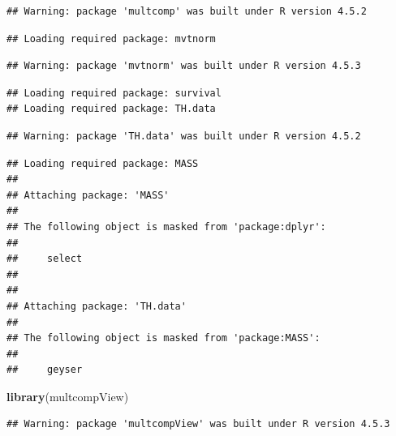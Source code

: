 \documentclass[
]{article}
\newenvironment{Shaded}{\begin{snugshade}}{\end{snugshade}}
\newcommand{\FunctionTok}[1]{\textcolor[rgb]{0.13,0.29,0.53}{\textbf{#1}}}
\newcommand{\NormalTok}[1]{#1}
\newcommand{\OtherTok}[1]{\textcolor[rgb]{0.56,0.35,0.01}{#1}}
\newcommand{\SpecialCharTok}[1]{\textcolor[rgb]{0.81,0.36,0.00}{\textbf{#1}}}
\newcommand{\StringTok}[1]{\textcolor[rgb]{0.31,0.60,0.02}{#1}}
\begin{document}
\begin{verbatim}
## Warning: package 'multcomp' was built under R version 4.5.2
\end{verbatim}

\begin{verbatim}
## Loading required package: mvtnorm
\end{verbatim}

\begin{verbatim}
## Warning: package 'mvtnorm' was built under R version 4.5.3
\end{verbatim}

\begin{verbatim}
## Loading required package: survival
## Loading required package: TH.data
\end{verbatim}

\begin{verbatim}
## Warning: package 'TH.data' was built under R version 4.5.2
\end{verbatim}

\begin{verbatim}
## Loading required package: MASS
## 
## Attaching package: 'MASS'
## 
## The following object is masked from 'package:dplyr':
## 
##     select
## 
## 
## Attaching package: 'TH.data'
## 
## The following object is masked from 'package:MASS':
## 
##     geyser
\end{verbatim}

\begin{Shaded}
\begin{Highlighting}[]
\FunctionTok{library}\NormalTok{(multcompView)}
\end{Highlighting}
\end{Shaded}

\begin{verbatim}
## Warning: package 'multcompView' was built under R version 4.5.3
\end{verbatim}

\begin{Shaded}
\end{Shaded}
\end{document}
